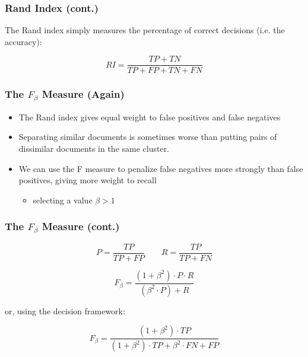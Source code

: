 \documentclass[svgnames]{beamer}
\begin{document}
\begin{frame}
    \frametitle{Rand Index (cont.)}
    The Rand index simply measures the percentage of correct decisions
    (i.e. the accuracy):
    \begin{block}{}
        \begin{displaymath}
            RI = \frac{TP+TN}{TP+FP+TN+FN}
        \end{displaymath}
    \end{block}
\end{frame}

\begin{frame}
    \frametitle{The $F_\beta$ Measure (Again)}
    \begin{itemize}
    \item The Rand index gives equal weight to false positives and false negatives
    \item Separating similar documents is sometimes worse than putting pairs of dissimilar documents in the same cluster. 
    \item We can use the F measure to penalize false negatives more strongly
        than false positives, giving more weight to recall
        \begin{itemize}
        \item selecting a value $\beta > 1$
        \end{itemize}
    \end{itemize}
\end{frame}

\begin{frame}
    \frametitle{The $F_\beta$ Measure (cont.)}
    \begin{block}{}
        \begin{displaymath}
            P = \frac{TP}{TP+FP} \qquad R = \frac{TP}{TP+FN}
        \end{displaymath}
    \end{block}
    \begin{block}{}
        \begin{displaymath}
            F_\beta = \frac{(1 + \beta^2)\cdot P \cdot R}{(\beta^2 \cdot P) + R}            
        \end{displaymath}
    \end{block}
    or, using the decision framework:
    \begin{block}{}
        \begin{displaymath}
            F_\beta = \frac{(1 + \beta^2) \cdot TP}{(1 + \beta^2) \cdot TP + \beta^2 \cdot FN + FP}
        \end{displaymath}
    \end{block}
\end{frame}

\end{document}
